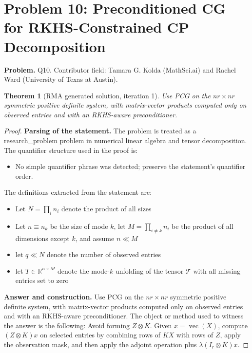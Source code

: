 \documentclass[11pt]{article}
\newtheorem{theorem}{Theorem}
\begin{document}
\section*{Problem 10: Preconditioned CG for RKHS-Constrained CP Decomposition}

\noindent\textbf{Problem.} Q10. Contributor field: Tamara G. Kolda (MathSci.ai) and Rachel Ward (University of Texas at Austin).

\begin{theorem}[RMA generated solution, iteration 1]
Use PCG on the \(nr\times nr\) symmetric positive definite system, with matrix-vector products computed only on observed entries and with an RKHS-aware preconditioner.
\end{theorem}

\begin{proof}
\textbf{Parsing of the statement.}
The problem is treated as a research_problem problem in numerical linear algebra and tensor decomposition.
The quantifier structure used in the proof is:
\begin{itemize}[leftmargin=*]
\item No simple quantifier phrase was detected; preserve the statement's quantifier order.
\end{itemize}
The definitions extracted from the statement are:
\begin{itemize}[leftmargin=*]
\item Let $N = \prod_i n_i$ denote the product of all sizes
\item Let $n \equiv n_k$ be the size of mode $k$, let $M = \prod_{i\neq k} n_i$ be the product of all dimensions except $k$, and assume $n \ll M$
\item let $q \ll N$ denote the number of observed entries
\item let $T \in \mathbb{R}^{n \times M}$ denote the mode-$k$ unfolding of the tensor $\mathcal{T}$ with all missing entries set to zero
\end{itemize}

\textbf{Answer and construction.}
Use PCG on the \(nr\times nr\) symmetric positive definite system, with matrix-vector products computed only on observed entries and with an RKHS-aware preconditioner. The object or method used to witness the answer is the
following: Avoid forming \(Z\otimes K\). Given \(x=\operatorname{vec}(X)\), compute \((Z\otimes K)x\) on selected entries by combining rows of \(KX\) with rows of \(Z\), apply the observation mask, and then apply the adjoint operation plus \(\lambda(I_r\otimes K)x\).


\end{proof}
\end{document}
